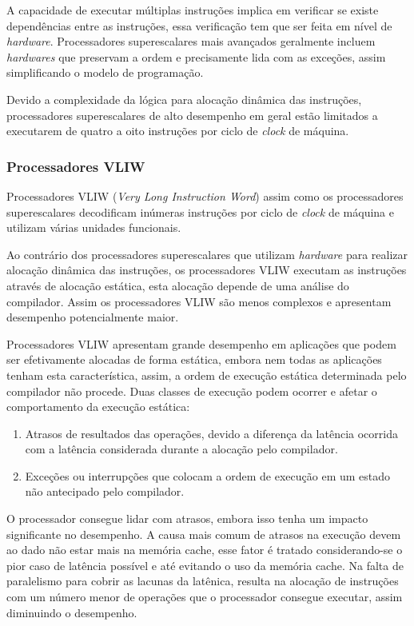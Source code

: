 A capacidade de executar múltiplas instruções implica em verificar se existe
dependências entre as instruções, essa verificação tem que ser feita em nível de
\textit{hardware}. 
Processadores superescalares mais avançados geralmente incluem 
\textit{hardwares} que preservam a ordem e precisamente lida com as exceções, 
assim simplificando o modelo de programação.

Devido a complexidade da lógica para alocação dinâmica das instruções,
processadores superescalares de alto desempenho em geral estão limitados a
executarem de quatro a oito instruções por ciclo de \textit{clock} de máquina.


\subsubsection{Processadores VLIW}

Processadores VLIW (\textit{Very Long Instruction Word}) assim como os
processadores superescalares decodificam inúmeras instruções por ciclo de
\textit{clock} de máquina e utilizam várias unidades funcionais.

Ao contrário dos processadores superescalares que utilizam \textit{hardware}
para realizar alocação dinâmica das instruções, os processadores VLIW executam as 
instruções através de alocação estática, esta alocação depende de uma análise do
compilador.
Assim os processadores VLIW são menos complexos e apresentam desempenho 
potencialmente maior.

Processadores VLIW apresentam grande desempenho em aplicações que podem ser 
efetivamente alocadas de forma estática, embora nem todas as aplicações
tenham esta característica, assim, a ordem de execução estática determinada pelo
compilador não procede. 
Duas classes de execução podem ocorrer e afetar o comportamento da execução 
estática:

\begin{enumerate}
        \item Atrasos de resultados das operações, devido a diferença da latência
                ocorrida com a latência considerada durante a alocação pelo
                compilador.
        \item Exceções ou interrupções que colocam a ordem de execução em um
                estado não antecipado pelo compilador.
\end{enumerate}

O processador consegue lidar com atrasos, embora isso tenha um impacto 
significante no desempenho. 
A causa mais comum de atrasos na execução devem ao dado não estar mais na 
memória cache, esse fator é tratado considerando-se o pior caso de latência 
possível e até evitando o uso da memória cache. 
Na falta de paralelismo para cobrir as lacunas da latênica, resulta na 
alocação de instruções com um número menor de operações que o processador 
consegue executar, assim diminuindo o desempenho.


